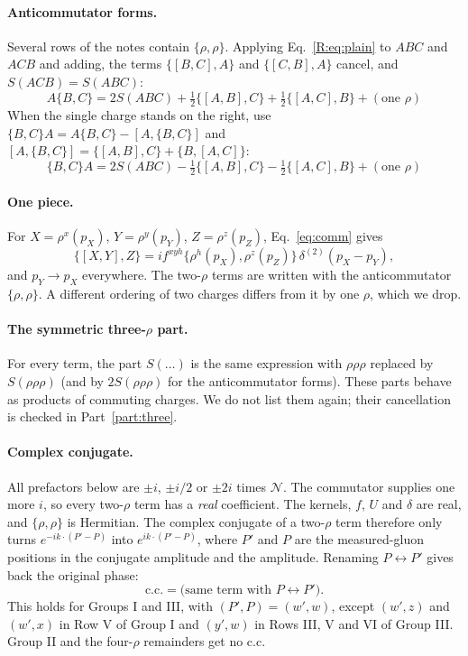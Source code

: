 \documentclass[10pt]{article}
\numberwithin{equation}{section}
\newcommand{\NN}{\mathcal N}
\begin{document}
\paragraph{Anticommutator forms.} Several rows of the notes contain $\{\rho,\rho\}$. Applying Eq.~\eqref{R:eq:plain} to $ABC$ and $ACB$ and adding, the terms $\{[B,C],A\}$ and $\{[C,B],A\}$ cancel, and $S(ACB)=S(ABC)$:
\begin{equation}
\boxed{\;A\{B,C\}=2S(ABC)+\tfrac12\big\{[A,B],C\big\}+\tfrac12\big\{[A,C],B\big\}+(\text{one }\rho)\;}
\label{R:eq:Aanti}
\end{equation}
When the single charge stands on the right, use $\{B,C\}A=A\{B,C\}-[A,\{B,C\}]$ and $[A,\{B,C\}]=\{[A,B],C\}+\{B,[A,C]\}$:
\begin{equation}
\boxed{\;\{B,C\}A=2S(ABC)-\tfrac12\big\{[A,B],C\big\}-\tfrac12\big\{[A,C],B\big\}+(\text{one }\rho)\;}
\label{R:eq:antiA}
\end{equation}
\paragraph{One piece.} For $X=\rho^x(p_X)$, $Y=\rho^y(p_Y)$, $Z=\rho^z(p_Z)$, Eq.~\eqref{eq:comm} gives
\begin{equation}
\big\{[X,Y],Z\big\}=i f^{xyh}\big\{\rho^h(p_X),\rho^z(p_Z)\big\}\,\delta^{(2)}(p_X-p_Y),
\end{equation}
and $p_Y\to p_X$ everywhere. The two-$\rho$ terms are written with the anticommutator $\{\rho,\rho\}$. A different ordering of two charges differs from it by one $\rho$, which we drop.

\paragraph{The symmetric three-$\rho$ part.} For every term, the part $S(\dots)$ is the same expression with $\rho\rho\rho$ replaced by $S(\rho\rho\rho)$ (and by $2S(\rho\rho\rho)$ for the anticommutator forms). These parts behave as products of commuting charges. We do not list them again; their cancellation is checked in Part~\ref{part:three}.

\paragraph{Complex conjugate.} All prefactors below are $\pm i$, $\pm i/2$ or $\pm2i$ times $\NN$. The commutator supplies one more $i$, so every two-$\rho$ term has a \emph{real} coefficient. The kernels, $f$, $U$ and $\delta$ are real, and $\{\rho,\rho\}$ is Hermitian. The complex conjugate of a two-$\rho$ term therefore only turns $e^{-ik\cdot(P'-P)}$ into $e^{ik\cdot(P'-P)}$, where $P'$ and $P$ are the measured-gluon positions in the conjugate amplitude and the amplitude. Renaming $P\leftrightarrow P'$ gives back the original phase:
\begin{equation}
\text{c.c.}=\big(\text{same term with }P\leftrightarrow P'\big).
\end{equation}
This holds for Groups I and III, with $(P',P)=(w',w)$, except $(w',z)$ and $(w',x)$ in Row V of Group I and $(y',w)$ in Rows III, V and VI of Group III. Group II and the four-$\rho$ remainders get no c.c.
\end{document}

